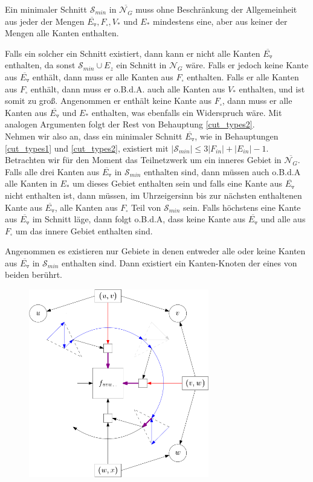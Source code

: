 \begin{claim}\label{cut_types2}

Ein minimaler Schnitt $\mathcal{S}_{min}$ in $\overline{\mathcal{N}_G}$ muss ohne Beschränkung der Allgemeinheit aus jeder der Mengen $\overline{E_\triangledown}, F_\square, V_*$ und $E_*$ mindestens eine, aber aus keiner der Mengen alle Kanten enthalten.

\end{claim}

Falls ein solcher ein Schnitt existiert, dann kann er nicht alle Kanten $\overline{E_\triangledown}$ enthalten, da sonst $\mathcal{S}_{min} \cup E_z$ ein Schnitt in $\mathcal{N}_G$ wäre. Falls er jedoch keine Kante aus $\overline{E_\triangledown}$ enthält, dann muss er alle Kanten aus $F_\square$ enthalten. Falls er alle Kanten aus $F_\square$ enthält, dann muss er o.B.d.A. auch alle Kanten aus $V_*$ enthalten, und ist somit zu groß. Angenommen er enthält keine Kante aus $F_\square$, dann muss er alle Kanten aus $\overline{E_\triangledown}$ und $E_*$ enthalten, was ebenfalls ein Widerspruch wäre. Mit analogen Argumenten folgt der Rest von Behauptung \ref{cut_types2}. \\

Nehmen wir also an, dass ein minimaler Schnitt $\overline{E_\triangledown}$, wie in Behauptungen \ref{cut_types1} und \ref{cut_types2}, existiert mit $|\mathcal{S}_{min}| \leq 3|F_{in}| + |E_{in}| - 1$. Betrachten wir für den Moment das Teilnetzwerk um ein inneres Gebiet in $\overline{\mathcal{N}_G}$. Falls alle drei Kanten aus $\overline{E_\triangledown}$ in $\mathcal{S}_{min}$ enthalten sind, dann müssen auch o.B.d.A alle Kanten in $E_*$ um dieses Gebiet enthalten sein und falls eine Kante aus $\overline{E_\triangledown}$ nicht enthalten ist, dann müssen, im Uhrzeigersinn bis zur nächsten enthaltenen Kante aus $\overline{E_\triangledown}$, alle Kanten aus $F_\square$ Teil von $\mathcal{S}_{min}$ sein. Falls höchstens eine Kante aus $\overline{E_\triangledown}$ im Schnitt läge, dann folgt o.B.d.A, dass keine Kante aus $\overline{E_\triangledown}$ und alle aus $F_\square$ um das innere Gebiet enthalten sind. 

Angenommen es existieren nur Gebiete in denen entweder alle oder keine Kanten aus $\overline{E_\triangledown}$ in $\mathcal{S}_{min}$ enthalten sind. Dann existiert ein Kanten-Knoten der eines von beiden berührt.

\begin{figure}[h]
	\centering
  	\includegraphics[width=0.7\textwidth]{face_cut_example.png}
  	\caption{}
\end{figure}